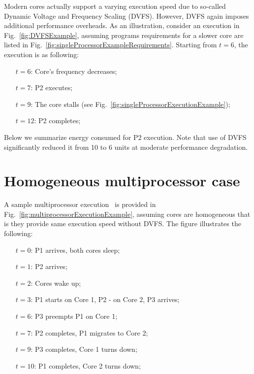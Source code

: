 Modern cores actually support a varying execution speed due to so-called Dynamic Voltage and Frequency Scaling (DVFS). However, DVFS again imposes additional performance overheads. As an illustration, consider an execution in Fig.~\ref{fig:DVFSExample}, assuming programs requirements for a slower core are listed in Fig.~\ref{fig:singleProcessorExampleRequirements}. Starting from $t=6$, the execution is as following:
\begin{enumerate}
\itemindent=18pt
\item[$t=6$:] Core's frequency decreases;
\item[$t=7$:] P2 executes;
\item[$t=9$:] The core stalls (see Fig.~\ref{fig:singleProcessorExecutionExample});
\itemindent=23pt
\item[$t=12$:] P2 completes;
\end{enumerate}

Below we summarize energy consumed for P2 execution. Note that use of DVFS significantly reduced it from 10 to 6 units at moderate performance degradation.



\section{Homogeneous multiprocessor case}
\label{sec:homogeneousMultiprocessorCase}

A sample multiprocessor execution~\cite{Gepner2006,Chai2007,Kumar2003, Nayfeh1997, Geer2005} is provided in  Fig.~\ref{fig:multiprocessorExecutionExample}, assuming cores are homogeneous that is they provide same execution speed without DVFS. The figure illustrates the following:
\begin{enumerate}
\itemindent=18pt
\item[$t=0$:] P1 arrives, both cores sleep;
\item[$t=1$:] P2 arrives;
\item[$t=2$:] Cores wake up;
\item[$t=3$:] P1 starts on Core 1, P2 \-- on Core 2, P3 arrives;
\item[$t=6$:] P3 preempts P1 on Core 1;
\item[$t=7$:] P2 completes, P1 migrates to Core 2;
\item[$t=9$:] P3 completes, Core 1 turns down;
\itemindent=23pt
\item[$t=10$:] P1 completes, Core 2 turns down;
\end{enumerate}

